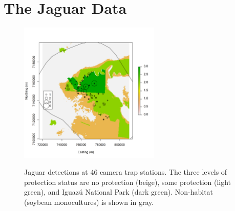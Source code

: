 \section{The Jaguar Data}

\begin{figure}%
\centering
\includegraphics[width=0.6\textwidth]{Ch11-Statespace/figs/jaguarCountMap}
\label{state-space.fig.jaguarCts}
\caption{Jaguar detections at 46 camera trap stations. The three levels of
  protection status are no protection (beige), some protection (light
  green), and Iguaz\'{u} National Park (dark green). Non-habitat
  (soybean monocultures) is shown in gray. }
\end{figure}

